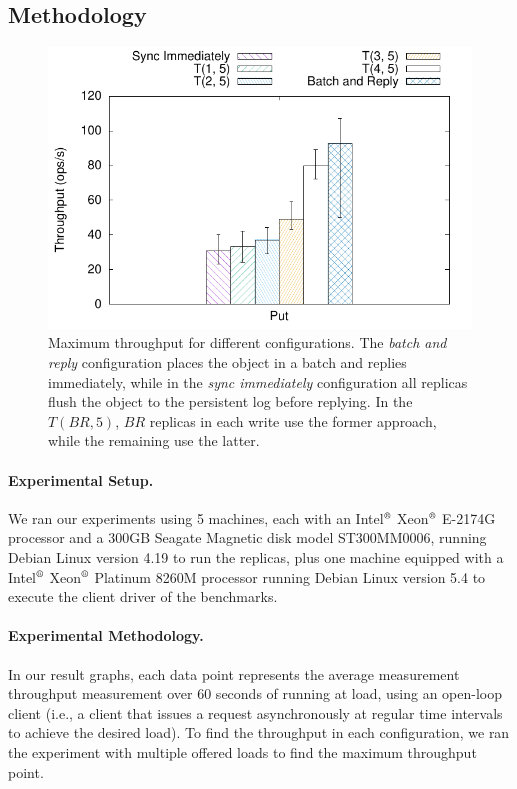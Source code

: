 \subsection{Methodology}\label{ssec:r2s2methodology}

\begin{figure}[t]
    \centering
    \includegraphics[width=.75\linewidth]{r2s2_results/abd_small/tput.pdf}
    \caption{Maximum throughput for different configurations.
    The \emph{batch and reply} configuration places the
    object in a batch and replies immediately, while in the
    \emph{sync immediately} configuration all replicas
    flush the object to the persistent log before replying. In
    the $T(BR, 5)$, $BR$ replicas in each write use the former
    approach, while the remaining use the
    latter.}\label{fig:r2s2_asym}
\end{figure}
\paragraph{Experimental Setup.}
We ran our experiments using 5 machines, each with an
Intel$^\text{\textregistered}$ Xeon$^\text{\textregistered}$
E-2174G processor and a 300GB Seagate Magnetic disk model
ST300MM0006, running Debian Linux version 4.19 to run the
replicas, plus one machine equipped with a
Intel$^\text{\textregistered}$ Xeon$^\text{\textregistered}$
Platinum 8260M processor running Debian Linux version 5.4 to
execute the client driver of the benchmarks.

\paragraph{Experimental Methodology.} In our result graphs, each data point represents the average
measurement throughput measurement over $60$ seconds of running
at load, using an open-loop client (i.e., a client that issues a
request asynchronously at regular time intervals to achieve the
desired load). To find the throughput in each configuration, we
ran the experiment with multiple offered loads to find the
maximum throughput point.


